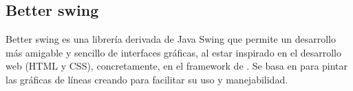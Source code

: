 \subsection{Better swing}

Better swing\cite{betterswing} es una librería derivada de Java Swing que permite un desarrollo más amigable y sencillo de interfaces gráficas, al estar inspirado en el desarrollo web (HTML y CSS), concretamente, en el framework de . Se basa en  para pintar las gráficas de líneas creando  para facilitar su uso y manejabilidad.




